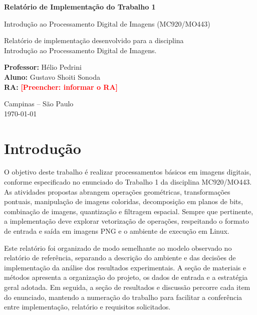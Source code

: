 \documentclass[12pt,a4paper]{article}
\newcommand{\placeholder}[1]{\textcolor{red}{\textbf{[Preencher: #1]}}}
\begin{document}
\hypersetup{pageanchor=false}

\begin{titlepage}
  \centering

  {\Large \textbf{Relatório de Implementação do Trabalho 1}\par}
  \vspace{0.5cm}
  {\large Introdução ao Processamento Digital de Imagens (MC920/MO443)\par}
  \vspace{1.2cm}

  {\large Relatório de implementação desenvolvido para a disciplina\\
  Introdução ao Processamento Digital de Imagens.\par}

  \vspace{1.5cm}

  \begin{flushleft}
    \textbf{Professor:} Hélio Pedrini\\
    \textbf{Aluno:} Gustavo Shoiti Sonoda\\
    \textbf{RA:} \placeholder{informar o RA}
  \end{flushleft}

  \vfill

  Campinas -- São Paulo\\
  \today
\end{titlepage}

\tableofcontents
\newpage
\hypersetup{pageanchor=true}

\section{Introdução}

O objetivo deste trabalho é realizar processamentos básicos em imagens digitais, conforme especificado no enunciado do Trabalho 1 da disciplina MC920/MO443. As atividades propostas abrangem operações geométricas, transformações pontuais, manipulação de imagens coloridas, decomposição em planos de bits, combinação de imagens, quantização e filtragem espacial. Sempre que pertinente, a implementação deve explorar vetorização de operações, respeitando o formato de entrada e saída em imagens PNG e o ambiente de execução em Linux.

Este relatório foi organizado de modo semelhante ao modelo observado no relatório de referência, separando a descrição do ambiente e das decisões de implementação da análise dos resultados experimentais. A seção de materiais e métodos apresenta a organização do projeto, os dados de entrada e a estratégia geral adotada. Em seguida, a seção de resultados e discussão percorre cada item do enunciado, mantendo a numeração do trabalho para facilitar a conferência entre implementação, relatório e requisitos solicitados.
\end{document}
